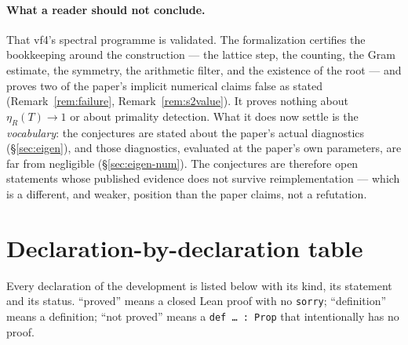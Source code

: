 \documentclass[11pt,a4paper]{article}
\newcommand{\code}[1]{\texttt{#1}}
\theoremstyle{definition}
\theoremstyle{remark}
\begin{document}
\paragraph{What a reader should not conclude.}  That vf4's spectral programme is validated.
The formalization certifies the bookkeeping around the construction --- the lattice step,
the counting, the Gram estimate, the symmetry, the arithmetic filter, and the existence of
the root --- and proves two of the paper's implicit numerical claims false as stated
(Remark~\ref{rem:failure}, Remark~\ref{rem:s2value}).  It proves nothing about
$\eta_R(T)\to1$ or about primality detection.  What it does now settle is the \emph{vocabulary}:
the conjectures are stated about the paper's actual diagnostics (\S\ref{sec:eigen}), and those
diagnostics, evaluated at the paper's own parameters, are far from negligible
(\S\ref{sec:eigen-num}).  The conjectures are therefore open statements whose published
evidence does not survive reimplementation --- which is a different, and weaker, position
than the paper claims, not a refutation.

\section{Declaration-by-declaration table}\label{sec:table}

Every declaration of the development is listed below with its kind, its statement and its
status.  ``proved'' means a closed Lean proof with no \code{sorry}; ``definition'' means a
definition; ``not proved'' means a \code{def \dots{} : Prop} that intentionally has no
proof.
\end{document}

